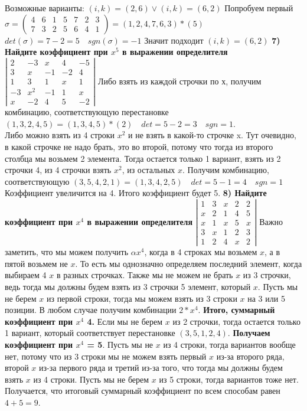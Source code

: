 \documentclass[12pt, a4paper]{article}
\begin{document}
	Возможные варианты: $(i, k) = (2, 6) \lor (i, k) = (6, 2)$ Попробуем первый \sspace
	$\sigma = \begin{pmatrix} 4 & 6 & 1 & 5  & 7 & 2 & 3\\ 7 & 3 & 2 & 5 & 6 & 4 & 1\end{pmatrix} = (1,2,4,7,6,3)*(5)$ \sspace
	$det(\sigma) = 7 - 2 = 5 \quad sgn(\sigma) = -1$ \sspace
	Значит подходит $(i,k) = (6, 2)$
	\sspace
	\textbf{7) Найдите коэффициент при $x^5$ в выражении определителя} \sspace
	$\left | \begin{array}{rrrrr} 2 & -3 & x & 4 & -5\\ 3 & x & -1 & -2 & 4\\ 1 & 3 & 1 & x & 1\\ -3 & x^2 & -1 & 1 & x\\ x & -2 & 4 & 5 & -2 \end{array} \right |$ \sspace
	Либо взять из каждой строчки по х, получим комбинацию, соответствующую перестановке $(1, 3,2,4,5) = (1, 3,4,5)*(2) \quad det = 5 - 2 = 3 \quad sgn = 1$. \\
	Либо можно взять из 4 строки $x^2$ и не взять в какой-то строчке x. Тут очевидно, в какой строчке не надо брать, это во второй, потому что тогда из второго столбца мы возьмем 2 элемента. Тогда остается только 1 вариант, взять из 2 строчки 4, из 4 строчки взять $x^2$, из остальных $x$. Получим комбинацию, соответствующую $(3, 5, 4, 2,1) = (1,3,4,2,5) \quad det = 5 - 1 = 4 \quad sgn = 1$ Коэффициент увеличится на 4. Итого коэффициент будет 5. \sspace
	\textbf{8) Найдите коэффициент при $x^4$ в выражении определителя} \sspace
	$\left | \begin{array}{rrrrr} 1 & 3 & x & 2 & 2\\ x & 2 & 1 & 4 & 5\\ x & 1 & x & 5 & x\\ 3 & x & 1& 2 & 3\\ 1 & 2 & 4 & x & 2 \end{array} \right |$ \sspace
	Важно заметить, что мы можем получить $\alpha x^4$, когда в 4 строках мы возьмем $x$, а в пятой возьмем не $x$. То есть мы однозначно определяем последний элемент, когда выбираем 4 $x$ в разных строчках. Также мы не можем не брать $x$ из 3 строчки, ведь тогда мы должны будем взять из 3 строчки 5 элемент, который $x$. Пусть мы не берем $x$ из первой строки, тогда мы можем взять из 3 строки $x$ на 3 или 5 позиции. В любом случае получим комбинации $2*x^4$. \textbf{Итого, суммарный коэффициент при $x^4$ 4.} Если мы не берем $x$ из 2 строчки, тогда остается только 1 вариант, который соответствует перестановке $(3,5,1,2,4)$. \textbf{Получаем коэффициент при $x^4$ = 5}. Пусть мы не $x$ из 4 строки, тогда вариантов вообще нет, потому что из 3 строки мы не можем взять первый $x$ из-за второго ряда, второй $x$ из-за первого ряда и третий из-за того, что тогда мы должны будем взять $x$ из 4 строки. Пусть мы не берем $x$ из 5 строки, тогда вариантов тоже нет. Получается, что итоговый суммарный коэффициент по всем способам равен $4 + 5 = 9$. \sspace
\end{document}
